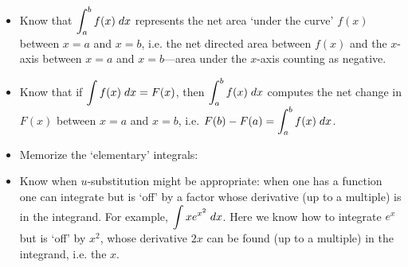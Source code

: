 \documentclass[11pt,letterpaper]{article}
\begin{document}
\begin{itemize}
\item Know that $\displaystyle\int_a^b f(x) \;dx$ represents the net area `under the curve' $f(x)$ between $x= a$ and $x= b$, i.e. the net directed area between $f(x)$ and the $x$-axis between $x= a$ and $x= b$---area under the $x$-axis counting as negative.

\item Know that if $\displaystyle\int f(x) \;dx= F(x)$, then $\displaystyle\int_a^b f(x) \;dx$ computes the net change in $F(x)$ between $x= a$ and $x= b$, i.e. $\displaystyle F(b) - F(a)= \int_a^b f(x) \;dx$.

\item Memorize the `elementary' integrals:

\item Know when $u$-substitution might be appropriate: when one has a function one can integrate but is `off' by a factor whose derivative (up to a multiple) is in the integrand. For example, $\displaystyle\int x e^{x^2} \;dx$. Here we know how to integrate $e^x$ but is `off' by $x^2$, whose derivative $2x$ can be found (up to a multiple) in the integrand, i.e. the $x$.


\end{itemize}
\end{document}
